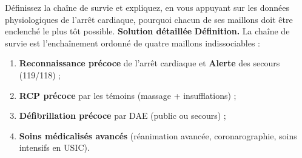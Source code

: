 \documentclass[11pt]{article}
\newcommand{\cle}[1]{{\popxbold\color{popdark}#1}}
\begin{document}
\begin{exoresolu}
Définissez la chaîne de survie et expliquez, en vous appuyant sur les données physiologiques de l'arrêt cardiaque, pourquoi chacun de ses maillons doit être enclenché le plus tôt possible.
\tcblower
\textbf{Solution détaillée}
\textbf{Définition.} La \cle{chaîne de survie} est l'enchaînement ordonné de quatre maillons indissociables :
\begin{enumerate}
\item \textbf{Reconnaissance précoce} de l'arrêt cardiaque et \textbf{Alerte} des secours (119/118) ;
\item \textbf{RCP précoce} par les témoins (massage + insufflations) ;
\item \textbf{Défibrillation précoce} par DAE (public ou secours) ;
\item \textbf{Soins médicalisés avancés} (réanimation avancée, coronarographie, soins intensifs en USIC).
\end{enumerate}


\end{exoresolu}
\end{document}
